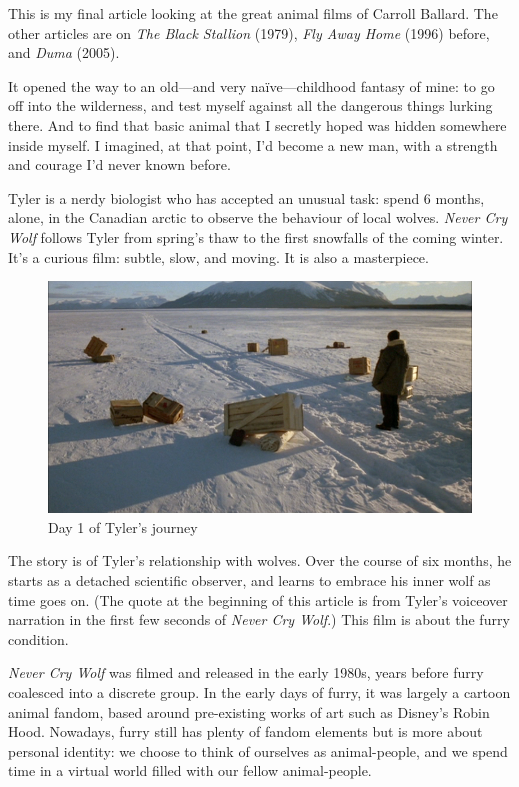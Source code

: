 
This is my final article looking at the great animal films of Carroll Ballard. The other articles are on \textit{The Black Stallion} (1979), \textit{Fly Away Home} (1996) before, and \textit{Duma} (2005).

It opened the way to an old—and very naïve—childhood fantasy of mine: to go off into the wilderness, and test myself against all the dangerous things lurking there. And to find that basic animal that I secretly hoped was hidden somewhere inside myself. I imagined, at that point, I’d become a new man, with a strength and courage I’d never known before.

Tyler is a nerdy biologist who has accepted an unusual task: spend 6 months, alone, in the Canadian arctic to observe the behaviour of local wolves. \textit{Never Cry Wolf} follows Tyler from spring’s thaw to the first snowfalls of the coming winter. It’s a curious film: subtle, slow, and moving. It is also a masterpiece.

\begin{figure}
  \begin{center}
    \includegraphics[width=\textwidth]{content/assets/never-cry-wolf--tyler}
  \end{center}
  \caption{Day 1 of Tyler's journey}
\end{figure}

The story is of Tyler’s relationship with wolves. Over the course of six months, he starts as a detached scientific observer, and learns to embrace his inner wolf as time goes on. (The quote at the beginning of this article is from Tyler’s voiceover narration in the first few seconds of \textit{Never Cry Wolf}.) This film is about the furry condition.

\textit{Never Cry Wolf} was filmed and released in the early 1980s, years before furry coalesced into a discrete group. In the early days of furry, it was largely a cartoon animal fandom, based around pre-existing works of art such as Disney’s Robin Hood. Nowadays, furry still has plenty of fandom elements but is more about personal identity: we choose to think of ourselves as animal-people, and we spend time in a virtual world filled with our fellow animal-people.

